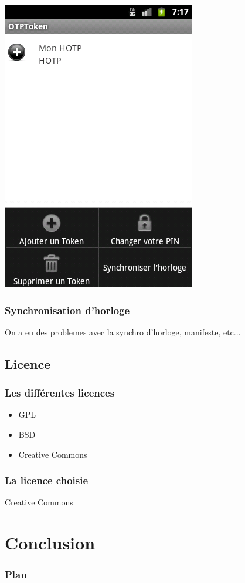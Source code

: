 \documentclass[xcolor=table]{beamer}
\begin{document}
\begin{frame}
\hspace{1em}
\includegraphics[scale=0.33]{../graphics/menu.png}
\end{frame}

\begin{frame}
\frametitle{Synchronisation d'horloge}
On a eu des problemes avec la synchro d'horloge, manifeste, etc...
\end{frame}

\subsection{Licence}
\begin{frame}
\frametitle{Les différentes licences}
\begin{itemize}
\item GPL
\item BSD
\item Creative Commons
\end{itemize}
\end{frame}

\begin{frame}
\frametitle{La licence choisie}
\Huge Creative Commons
\end{frame}

\section{Conclusion}
\begin{frame}  
\frametitle{Plan} 
\end{frame}
\end{document}
